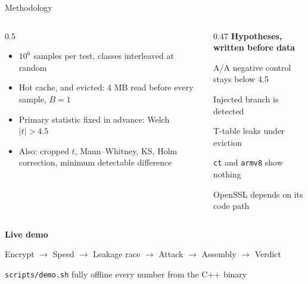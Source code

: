 \documentclass[aspectratio=169,11pt]{beamer}
\newcommand{\code}[1]{\texttt{#1}}
\begin{document}
\begin{frame}{Methodology}
\begin{columns}[T]
\begin{column}{0.5\textwidth}
\begin{itemize}
  \item $10^6$ samples per test, classes interleaved at random
  \item \alert{Hot} cache, and \alert{evicted}: 4 MB read before every sample, $B = 1$
  \item Primary statistic fixed in advance: Welch $\lvert t\rvert > 4.5$
  \item Also: cropped $t$, Mann--Whitney, KS, Holm correction, minimum detectable difference
\end{itemize}
\end{column}
\begin{column}{0.47\textwidth}
\textbf{Hypotheses, written before data}
\small
\begin{description}[H0]
  \item[H0] A/A negative control stays below 4.5
  \item[H1] Injected branch is detected
  \item[H2] T-table leaks under eviction
  \item[H3] \code{ct} and \code{armv8} show nothing
  \item[H4] OpenSSL depends on its code path
\end{description}
\end{column}
\end{columns}
\end{frame}

{
\begin{frame}[plain]
\centering\vfill
{\Huge\bfseries Live demo}\par\vspace{0.4cm}
{\large Encrypt $\rightarrow$ Speed $\rightarrow$ \alert{Leakage race} $\rightarrow$ \alert{Attack} $\rightarrow$ Assembly $\rightarrow$ Verdict}\par\vspace{0.3cm}
{\small\code{scripts/demo.sh} \textbullet{} fully offline \textbullet{} every number from the C++ binary}
\vfill
\end{frame}}
\end{document}

